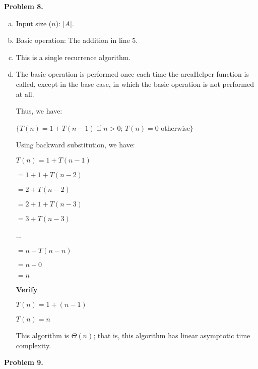 \documentclass{article}
\begin{document}
\textbf{Problem 8.}

	\begin{enumerate}[a.]
		\item Input size ($n$): $|A|$.
		
		\item Basic operation: The addition in line 5.
		
		\item This is a single recurrence algorithm.
		
		\item The basic operation is performed once each time the areaHelper function is called, except in the base case, in which the basic operation is not performed at all.
		
		Thus, we have:
		
		$\{T(n) = 1 + T(n - 1)$ if $n > 0$; $T(n) = 0$ otherwise$\}$
		
		Using backward substitution, we have:
		
		$T(n) = 1 + T(n - 1)$
		
		$ = 1 + 1 + T(n - 2)$
		
		$ = 2 + T(n - 2)$
		
		$ = 2 + 1 + T(n - 3)$
		
		$ = 3 + T(n - 3)$
		
		...
		
		$ = n + T(n - n)$
		
		$ = n + 0$
		
		$ = n$
		
		\textbf{Verify}
		
		$T(n) = 1 + (n - 1)$
		
		$T(n) = n$
		
		This algorithm is $\Theta(n)$; that is, this algorithm has linear asymptotic time complexity.
	\end{enumerate}


\newpage

\textbf{Problem 9.}
\end{document}
